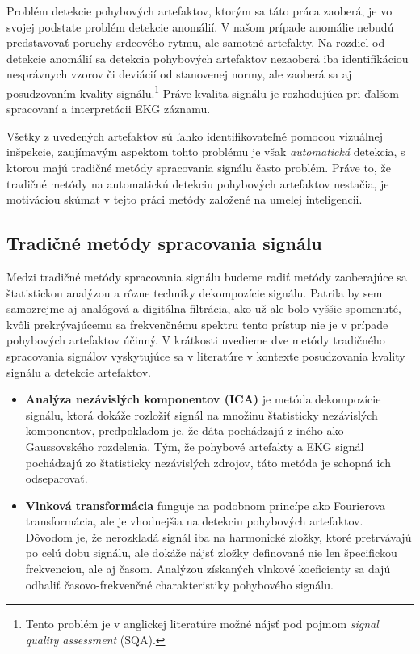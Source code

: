 Problém detekcie pohybových artefaktov, ktorým sa táto práca zaoberá, je vo svojej podstate problém detekcie anomálií. V našom prípade anomálie nebudú predstavovať poruchy srdcového rytmu, ale samotné artefakty. Na rozdiel od detekcie anomálií sa detekcia pohybových artefaktov nezaoberá iba identifikáciou nesprávnych vzorov či deviácií od stanovenej normy, ale zaoberá sa aj posudzovaním kvality signálu.\footnote{Tento problém je v anglickej literatúre možné nájsť pod pojmom \textit{signal quality assessment} (SQA).} Práve kvalita signálu je rozhodujúca pri ďalšom spracovaní a interpretácii EKG záznamu.

Všetky z uvedených artefaktov sú ľahko identifikovateľné pomocou vizuálnej inšpekcie, zaujímavým aspektom tohto problému je však \textit{automatická} detekcia, s ktorou majú tradičné metódy spracovania signálu často problém. Práve to, že tradičné metódy na automatickú detekciu pohybových artefaktov nestačia, je motiváciou skúmať v tejto práci metódy založené na umelej inteligencii.

\subsection{Tradičné metódy spracovania signálu}

Medzi tradičné metódy spracovania signálu budeme radiť metódy zaoberajúce sa štatistickou analýzou a rôzne techniky dekompozície signálu. Patrila by sem samozrejme aj analógová a digitálna filtrácia, ako už ale bolo vyššie spomenuté, kvôli prekrývajúcemu sa frekvenčnému spektru tento prístup nie je v prípade pohybových artefaktov účinný. V krátkosti uvedieme dve metódy tradičného spracovania signálov vyskytujúce sa v literatúre v kontexte posudzovania kvality signálu a detekcie artefaktov.

\begin{itemize}
    \item \textbf{Analýza nezávislých komponentov (ICA)} je metóda dekompozície signálu, ktorá dokáže rozložiť signál na množinu štatisticky nezávislých komponentov, predpokladom je, že dáta pochádzajú z iného ako Gaussovského rozdelenia. Tým, že pohybové artefakty a EKG signál pochádzajú zo štatisticky nezávislých zdrojov, táto metóda je schopná ich odseparovať.\cite{Milanesi2007}
    \item \textbf{Vlnková transformácia} funguje na podobnom princípe ako Fourierova transformácia, ale je vhodnejšia na detekciu pohybových artefaktov. Dôvodom je, že nerozkladá signál iba na harmonické zložky, ktoré pretrvávajú po celú dobu signálu, ale dokáže nájsť zložky definované nie len špecifickou frekvenciou, ale aj časom. Analýzou získaných vlnkové koeficienty sa dajú odhaliť časovo-frekvenčné charakteristiky pohybového signálu.\cite{Bhoraniya2014}  
\end{itemize}

